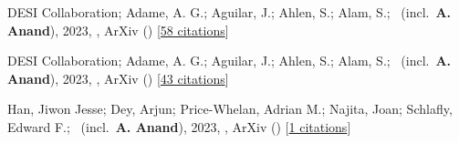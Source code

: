 \item[{\color{numcolor}\scriptsize3}] DESI Collaboration; Adame, A. G.; Aguilar, J.; Ahlen, S.; Alam, S.; \etal\ (incl.\ \textbf{A. Anand}), 2023, , ArXiv () [\href{https://ui.adsabs.harvard.edu/abs/2023arXiv230606308D}{58 citations}]

\item[{\color{numcolor}\scriptsize2}] DESI Collaboration; Adame, A. G.; Aguilar, J.; Ahlen, S.; Alam, S.; \etal\ (incl.\ \textbf{A. Anand}), 2023, , ArXiv () [\href{https://ui.adsabs.harvard.edu/abs/2023arXiv230606307D}{43 citations}]

\item[{\color{numcolor}\scriptsize1}] Han, Jiwon Jesse; Dey, Arjun; Price-Whelan, Adrian M.; Najita, Joan; Schlafly, Edward F.; \etal\ (incl.\ \textbf{A. Anand}), 2023, , ArXiv () [\href{https://ui.adsabs.harvard.edu/abs/2023arXiv230611784H}{1 citations}]